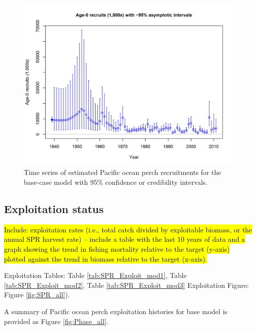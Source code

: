 \documentclass[12pt,]{article}
\begin{document}
\begin{figure}
\centering
\includegraphics{r4ss/plots_mod1/ts11_Age-0_recruits_(1000s)_with_95_asymptotic_intervals.png}
\caption{Time series of estimated Pacific ocean perch recruitments for
the base-case model with 95\% confidence or credibility intervals.
\label{fig:Recruits_all}}
\end{figure}

\FloatBarrier

\subsection*{Exploitation status}\label{exploitation-status}

\hl{Include: exploitation rates (i.e., total catch divided by exploitable biomass, or the annual SPR harvest rate) – include a table with the last 10 years of data and a graph showing the trend in fishing mortality relative to the target (y-axis) plotted against the trend in biomass relative to the target (x-axis).}

Exploitation Tables: Table \ref{tab:SPR_Exploit_mod1}, Table
\ref{tab:SPR_Exploit_mod2}, Table \ref{tab:SPR_Exploit_mod3}
Exploitation Figure: Figure \ref{fig:SPR_all}).

A summary of Pacific ocean perch exploitation histories for base model
is provided as Figure \ref{fig:Phase_all}.

\FloatBarrier
\end{document}
